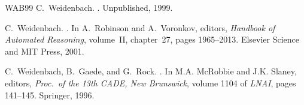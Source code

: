 \documentclass{report}
\begin{document}
\begin{thebibliography}{WAB{\etalchar{+}}99}
C.~Weidenbach.
.
\newblock Unpublished, 1999.

C.~Weidenbach.
.
\newblock In A.~Robinson and A.~Voronkov, editors, {\em Handbook of Automated
  Reasoning}, volume~II, chapter~27, pages 1965--2013. Elsevier Science and MIT
  Press, 2001.

C.~Weidenbach, B.~Gaede, and G.~Rock.
.
\newblock In M.A. McRobbie and J.K. Slaney, editors, {\em Proc.\ of the 13th
  CADE, New Brunswick}, volume 1104 of {\em LNAI}, pages 141--145. Springer,
  1996.

\end{thebibliography}

\printindex
\end{document}
